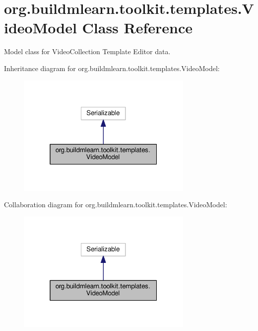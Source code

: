 \hypertarget{classorg_1_1buildmlearn_1_1toolkit_1_1templates_1_1VideoModel}{}\section{org.\+buildmlearn.\+toolkit.\+templates.\+Video\+Model Class Reference}
\label{classorg_1_1buildmlearn_1_1toolkit_1_1templates_1_1VideoModel}


Model class for Video\+Collection Template Editor data.  




Inheritance diagram for org.\+buildmlearn.\+toolkit.\+templates.\+Video\+Model\+:
\nopagebreak
\begin{figure}[H]
\begin{center}
\leavevmode
\includegraphics[width=241pt]{classorg_1_1buildmlearn_1_1toolkit_1_1templates_1_1VideoModel__inherit__graph}
\end{center}
\end{figure}


Collaboration diagram for org.\+buildmlearn.\+toolkit.\+templates.\+Video\+Model\+:
\nopagebreak
\begin{figure}[H]
\begin{center}
\leavevmode
\includegraphics[width=241pt]{classorg_1_1buildmlearn_1_1toolkit_1_1templates_1_1VideoModel__coll__graph}
\end{center}
\end{figure}
